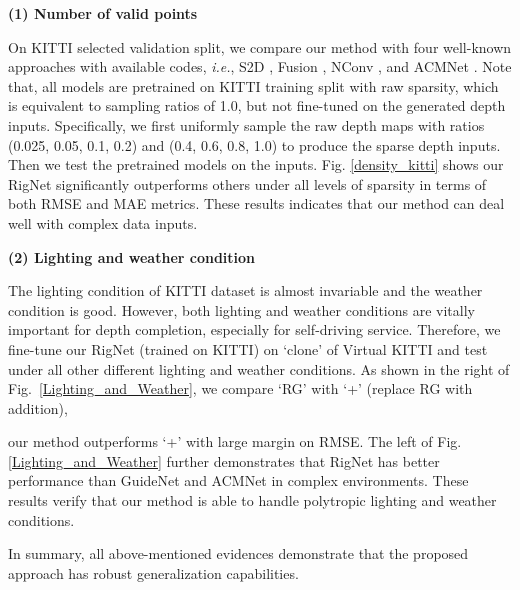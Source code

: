 \documentclass[runningheads]{llncs}
\begin{document}
\noindent \textbf{(1) Number of valid points}

On KITTI selected validation split, we compare our method with four well-known approaches with available codes, \emph{i.e.}, S2D \cite{ma2018self}, Fusion \cite{vangansbeke2019}, NConv \cite{2020Confidence}, and ACMNet \cite{zhao2021adaptive}. Note that, all models are pretrained on KITTI training split with raw sparsity, which is equivalent to sampling ratios of 1.0, but not fine-tuned on the generated depth inputs. Specifically, we first uniformly sample the raw depth maps with ratios (0.025, 0.05, 0.1, 0.2) and (0.4, 0.6, 0.8, 1.0) to produce the sparse depth inputs. Then we test the pretrained models on the inputs. Fig. \ref{density_kitti} shows our RigNet significantly outperforms others under all levels of sparsity in terms of both RMSE and MAE metrics. These results indicates that our method can deal well with complex data inputs.

\noindent \textbf{(2) Lighting and weather condition}

The lighting condition of KITTI dataset is almost invariable and the weather condition is good. However, both lighting and weather conditions are vitally important for depth completion, especially for self-driving service. Therefore, we fine-tune our RigNet (trained on KITTI) on `clone' of Virtual KITTI \cite{gaidon2016virtual} and test under all other different lighting and weather conditions. As shown in the right of Fig.~\ref{Lighting_and_Weather}, we compare `RG' with `+' (replace RG with addition), 




\noindent our method outperforms `+' with large margin on RMSE. The left of Fig. \ref{Lighting_and_Weather} further demonstrates that RigNet has better performance than GuideNet \cite{tang2020learning} and ACMNet \cite{zhao2021adaptive} in complex environments. These results verify that our method is able to handle polytropic lighting and weather conditions.





In summary, all above-mentioned evidences demonstrate that the proposed approach has robust generalization capabilities.
\end{document}
